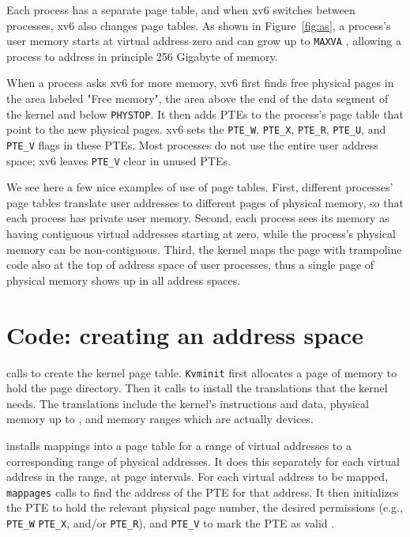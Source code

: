 Each process has a separate page table, and when xv6 switches between
processes, xv6 also changes page tables.
As shown in
Figure~\ref{fig:as},
a process's user memory starts at virtual address
zero and can grow up to
\texttt{MAXVA}
,
allowing a process to address in principle 256 Gigabyte of memory.

When a process asks xv6 for more memory,
xv6 first finds free physical pages in the area
labeled "Free memory", the area above the end of the data segment
of the kernel and below
\texttt{PHYSTOP}.
It then adds PTEs to the process's page table that point
to the new physical pages.
xv6 sets the
\lstinline{PTE_W},
\lstinline{PTE_X},
\lstinline{PTE_R},
\lstinline{PTE_U},
and
\lstinline{PTE_V}
flags in these PTEs.
Most processes do not use the entire user address space;
xv6 leaves
\lstinline{PTE_V}
clear in unused PTEs.

We see here a few nice examples of use of page tables.  First,
different processes' page tables translate user addresses to different
pages of physical memory, so that each process has private user
memory.  Second, each process sees its memory as having contiguous
virtual addresses starting at zero, while the process's physical
memory can be non-contiguous.  Third, the kernel maps the page with
trampoline code also at the top of address space of user processes,
thus a single page of physical memory shows up in all address spaces.
\section{Code: creating an address space}

calls
to create the kernel page table.
\lstinline{Kvminit}
first allocates a page of memory to hold the page directory.
Then it calls
to install the translations that the kernel needs.
The translations include the kernel's
instructions and data, physical memory up to
,
and memory ranges which are actually devices.

installs mappings into a page table
for a range of virtual addresses to
a corresponding range of physical addresses.
It does this separately for each virtual address in the range,
at page intervals.
For each virtual address to be mapped,
\lstinline{mappages}
calls
to find the address of the PTE for that address.
It then initializes the PTE to hold the relevant physical page
number, the desired permissions (e.g.,
\lstinline{PTE_W}
\lstinline{PTE_X},
and/or
\lstinline{PTE_R}),
and
\lstinline{PTE_V}
to mark the PTE as valid
.

